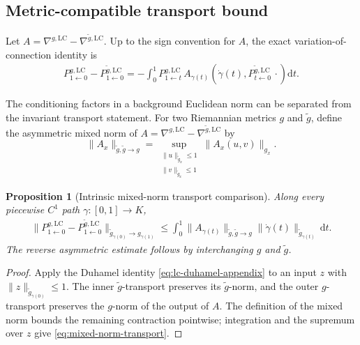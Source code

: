 \documentclass[11pt]{article}
\newtheorem{proposition}[theorem]{Proposition}
\theoremstyle{definition}
\theoremstyle{remark}
\newcommand{\LC}{\mathrm{LC}}
\newcommand{\dd}{\mathrm{d}}
\begin{document}
\subsection{Metric-compatible transport bound}

Let $A=\nabla^{g,\LC}-\nabla^{\widetilde g,\LC}$. Up to the sign convention for $A$, the exact variation-of-connection identity is
\begin{equation}
\begin{split}
    P^{g,\LC}_{1\leftarrow0}
    -P^{\widetilde g,\LC}_{1\leftarrow0}
    =-\int_0^1
      P^{g,\LC}_{1\leftarrow t}\,
      A_{\gamma(t)}\!\left(
        \dot\gamma(t),
        P^{\widetilde g,\LC}_{t\leftarrow0}\,\cdot
      \right)\dd t.
\end{split}
\label{eq:lc-duhamel-appendix}
\end{equation}

The conditioning factors in a background Euclidean norm can be separated from the invariant transport statement. For two Riemannian metrics $g$ and $\widetilde g$, define the asymmetric mixed norm of $A=\nabla^{g,\LC}-\nabla^{\widetilde g,\LC}$ by
\begin{equation}
    \|A_x\|_{\widetilde g,\widetilde g\to g}
    =\sup_{\substack{\|u\|_{\widetilde g_x}\le1\\
                      \|v\|_{\widetilde g_x}\le1}}
       \|A_x(u,v)\|_{g_x}.
\end{equation}

\begin{proposition}[Intrinsic mixed-norm transport comparison]\label{prop:mixed-norm-transport}
Along every piecewise $C^1$ path $\gamma:[0,1]\to K$,
\begin{equation}
\begin{split}
    \|P^{g,\LC}_{1\leftarrow0}
      -P^{\widetilde g,\LC}_{1\leftarrow0}\|_{
          \widetilde g_{\gamma(0)}\to g_{\gamma(1)}}
    \le \int_0^1
       \|A_{\gamma(t)}\|_{\widetilde g,\widetilde g\to g}
       \|\dot\gamma(t)\|_{\widetilde g_{\gamma(t)}}\,\dd t.
    \label{eq:mixed-norm-transport}
\end{split}
\end{equation}
The reverse asymmetric estimate follows by interchanging $g$ and $\widetilde g$.
\end{proposition}

\begin{proof}
Apply the Duhamel identity \eqref{eq:lc-duhamel-appendix} to an input $z$ with $\|z\|_{\widetilde g_{\gamma(0)}}\le1$. The inner $\widetilde g$-transport preserves its $\widetilde g$-norm, and the outer $g$-transport preserves the $g$-norm of the output of $A$. The definition of the mixed norm bounds the remaining contraction pointwise; integration and the supremum over $z$ give \eqref{eq:mixed-norm-transport}.
\end{proof}
\end{document}
